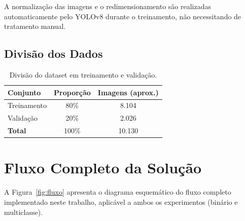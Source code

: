 \documentclass[12pt, a4paper]{article}
\begin{document}
A normalização das imagens e o redimensionamento são realizadas automaticamente pelo YOLOv8 durante o treinamento, não necessitando de tratamento manual.

\subsection{Divisão dos Dados}

\begin{table}[H]
\centering
\caption{Divisão do dataset em treinamento e validação.}
\label{tab:divisao}
\begin{tabular}{lcc}
\toprule
\textbf{Conjunto} & \textbf{Proporção} & \textbf{Imagens (aprox.)} \\
\midrule
Treinamento & 80\% & 8.104 \\
Validação   & 20\% & 2.026 \\
\midrule
\textbf{Total} & 100\% & 10.130 \\
\bottomrule
\end{tabular}
\end{table}

\section{Fluxo Completo da Solução}

A Figura~\ref{fig:fluxo} apresenta o diagrama esquemático do fluxo completo implementado neste trabalho, aplicável a ambos os experimentos (binário e multiclasse).
\end{document}
